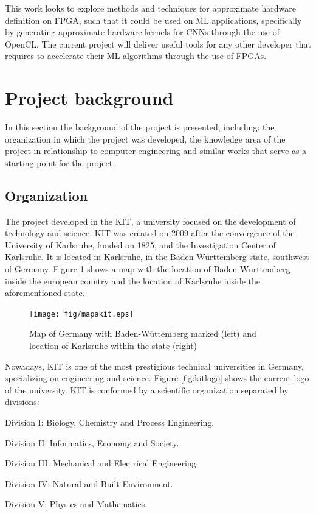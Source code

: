 This work looks to explore methods and techniques for approximate hardware definition on FPGA, such that
it could be used on ML applications, specifically by generating approximate hardware
kernels for CNNs through the use of OpenCL. The current project will deliver useful tools for any 
other developer that requires to accelerate their ML algorithms through the use of FPGAs.

\section{Project background}

In this section the background of the project is presented, including: the organization in which the project was
developed, the knowledge area of the project in relationship to computer engineering and similar
works that serve as a starting point for the project.

\subsection{Organization}

The project developed in the KIT, a university focused on the development of technology and science.
KIT was created on 2009 after the convergence of the University of Karlsruhe, funded on 1825, and the 
Investigation Center of Karlsruhe. It is located in Karlsruhe, in the Baden-Württemberg state,
southwest of Germany. Figure \ref{fig:mapakit} shows a map with the location of Baden-Württemberg inside the european
country and the location of Karlsruhe inside the aforementioned state.

\begin{figure}[H]
    \texttt{[image: fig/mapakit.eps]}
    \caption{Map of Germany with Baden-Wüttemberg marked (left) \cite{badenmap} and location of Karlsruhe within the state (right) \cite{karlsmap}}
    \label{fig:mapakit}
\end{figure}

Nowadays, KIT is one of the most prestigious technical universities in Germany, specializing on engineering
and science. Figure \ref{fig:kitlogo} shows the current logo of the university. KIT is conformed by a scientific organization
separated by divisions:

\begin{compactitem}
    \item Division I: Biology, Chemistry and Process Engineering.
    \item Division II: Informatics, Economy and Society.
    \item Division III: Mechanical and Electrical Engineering.
    \item Division IV: Natural and Built Environment.
    \item Division V: Physics and Mathematics.
\end{compactitem}

